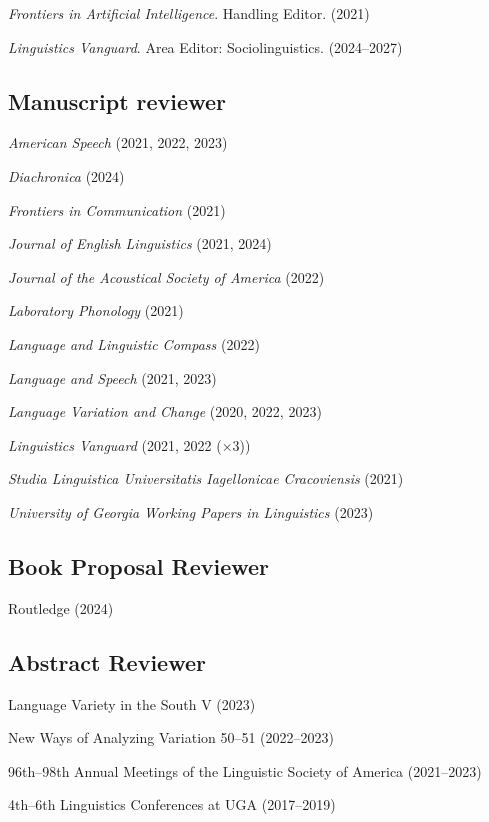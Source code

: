 \documentclass[
]{article}
\begin{document}
\emph{Frontiers in Artificial Intelligence}. Handling Editor. (2021)

\emph{Linguistics Vanguard}. Area Editor: Sociolinguistics. (2024--2027)

\hypertarget{manuscript-reviewer}{%
\subsection{Manuscript reviewer}\label{manuscript-reviewer}}

\emph{American Speech} (2021, 2022, 2023)

\emph{Diachronica} (2024)

\emph{Frontiers in Communication} (2021)

\emph{Journal of English Linguistics} (2021, 2024)

\emph{Journal of the Acoustical Society of America} (2022)

\emph{Laboratory Phonology} (2021)

\emph{Language and Linguistic Compass} (2022)

\emph{Language and Speech} (2021, 2023)

\emph{Language Variation and Change} (2020, 2022, 2023)

\emph{Linguistics Vanguard} (2021, 2022 (×3))

\emph{Studia Linguistica Universitatis Iagellonicae Cracoviensis} (2021)

\emph{University of Georgia Working Papers in Linguistics} (2023)

\hypertarget{book-proposal-reviewer}{%
\subsection{Book Proposal Reviewer}\label{book-proposal-reviewer}}

Routledge (2024)

\hypertarget{abstract-reviewer}{%
\subsection{Abstract Reviewer}\label{abstract-reviewer}}

Language Variety in the South V (2023)

New Ways of Analyzing Variation 50--51 (2022--2023)

96th--98th Annual Meetings of the Linguistic Society of America
(2021--2023)

4th--6th Linguistics Conferences at UGA (2017--2019)
\end{document}
